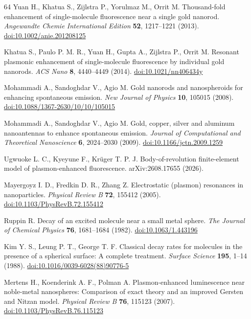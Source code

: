\begin{thebibliography}{64}
 Yuan H., Khatua S., Zijlstra P., Yorulmaz M., Orrit M. Thousand-fold enhancement of single-molecule fluorescence near a single gold nanorod. \textit{Angewandte Chemie International Edition} \textbf{52}, 1217--1221 (2013). \href{https://doi.org/10.1002/anie.201208125}{doi:10.1002/anie.201208125}

 Khatua S., Paulo P. M. R., Yuan H., Gupta A., Zijlstra P., Orrit M. Resonant plasmonic enhancement of single-molecule fluorescence by individual gold nanorods. \textit{ACS Nano} \textbf{8}, 4440--4449 (2014). \href{https://doi.org/10.1021/nn406434y}{doi:10.1021/nn406434y}

 Mohammadi A., Sandoghdar V., Agio M. Gold nanorods and nanospheroids for enhancing spontaneous emission. \textit{New Journal of Physics} \textbf{10}, 105015 (2008). \href{https://doi.org/10.1088/1367-2630/10/10/105015}{doi:10.1088/1367-2630/10/10/105015}

 Mohammadi A., Sandoghdar V., Agio M. Gold, copper, silver and aluminum nanoantennas to enhance spontaneous emission. \textit{Journal of Computational and Theoretical Nanoscience} \textbf{6}, 2024--2030 (2009). \href{https://doi.org/10.1166/jctn.2009.1259}{doi:10.1166/jctn.2009.1259}

 Ugwuoke L. C., Kyeyune F., Krüger T. P. J. Body-of-revolution finite-element model of plasmon-enhanced fluorescence. arXiv:2608.17655 (2026).

 Mayergoyz I. D., Fredkin D. R., Zhang Z. Electrostatic (plasmon) resonances in nanoparticles. \textit{Physical Review B} \textbf{72}, 155412 (2005). \href{https://doi.org/10.1103/PhysRevB.72.155412}{doi:10.1103/PhysRevB.72.155412}

 Ruppin R. Decay of an excited molecule near a small metal sphere. \textit{The Journal of Chemical Physics} \textbf{76}, 1681--1684 (1982). \href{https://doi.org/10.1063/1.443196}{doi:10.1063/1.443196}

 Kim Y. S., Leung P. T., George T. F. Classical decay rates for molecules in the presence of a spherical surface: A complete treatment. \textit{Surface Science} \textbf{195}, 1--14 (1988). \href{https://doi.org/10.1016/0039-6028(88)90776-5}{doi:10.1016/0039-6028(88)90776-5}

 Mertens H., Koenderink A. F., Polman A. Plasmon-enhanced luminescence near noble-metal nanospheres: Comparison of exact theory and an improved Gersten and Nitzan model. \textit{Physical Review B} \textbf{76}, 115123 (2007). \href{https://doi.org/10.1103/PhysRevB.76.115123}{doi:10.1103/PhysRevB.76.115123}


\end{thebibliography}
